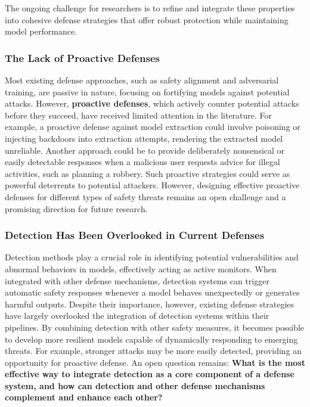 The ongoing challenge for researchers is to refine and integrate these properties into cohesive defense strategies that offer robust protection while maintaining model performance.


\subsubsection{The Lack of Proactive Defenses}

Most existing defense approaches, such as safety alignment and adversarial training, are passive in nature, focusing on fortifying models against potential attacks. However, \textbf{proactive defenses}, which actively counter potential attacks before they succeed, have received limited attention in the literature.
For example, a proactive defense against model extraction could involve poisoning or injecting backdoors into extraction attempts, rendering the extracted model unreliable. Another approach could be to provide deliberately nonsensical or easily detectable responses when a malicious user requests advice for illegal activities, such as planning a robbery.
Such proactive strategies could serve as powerful deterrents to potential attackers. However, designing effective proactive defenses for different types of safety threats remains an open challenge and a promising direction for future research.

\subsubsection{Detection Has Been Overlooked in Current Defenses}

Detection methods play a crucial role in identifying potential vulnerabilities and abnormal behaviors in models, effectively acting as active monitors. When integrated with other defense mechanisms, detection systems can trigger automatic safety responses whenever a model behaves unexpectedly or generates harmful outputs. Despite their importance, however, existing defense strategies have largely overlooked the integration of detection systems within their pipelines.
By combining detection with other safety measures, it becomes possible to develop more resilient models capable of dynamically responding to emerging threats. For example, stronger attacks may be more easily detected, providing an opportunity for proactive defense.
An open question remains: \textbf{What is the most effective way to integrate detection as a core component of a defense system, and how can detection and other defense mechanisms complement and enhance each other?}

